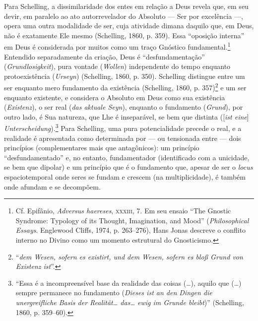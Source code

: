 Para Schelling, a dissimilaridade dos entes em relação a Deus
revela que, em seu devir, em paralelo ao ato autorrevelador do
Absoluto --- Ser por excelência ---, opera uma outra modalidade de
ser, cuja atividade dimana daquilo que, em Deus, não é
exatamente Ele mesmo (Schelling, 1860, p. 359). Essa “oposição
interna” em Deus é considerada por muitos como um traço Gnóstico
fundamental.\footnote{ Cf. Epifânio, \emph{Adversus haereses},
\textsc{xxxiii}, 7. Em seu ensaio “The Gnostic Syndrome: Typology of its
Thought, Imagination, and Mood” (\textit{Philosophical Essays}.
Englewood Cliffs, 1974, p. 263--276), Hans Jonas descreve o
conflito interno no Divino como um momento estrutural do
Gnosticismo.} Entendido separadamente da criação, Deus é
“desfundamentação” (\emph{Grundlosigkeit}), pura vontade
(\emph{Wollen}) independente do tempo enquanto protoexistência
(\emph{Urseyn}) (Schelling, 1860,
p. 350). Schelling distingue entre um ser enquanto mero
fundamento da existência (Schelling, 1860, p. 357)\footnote{
“\emph{dem Wesen, sofern es existirt, und dem Wesen, sofern es
bloß Grund von Existenz ist}”.} e um ser enquanto existente, e
considera o Absoluto em Deus como sua existência
(\emph{Existenz}), o ser real (\emph{das aktuale Seyn}),
enquanto o fundamento (\emph{Grund}), por outro lado, é Sua
natureza, que Lhe é inseparável, se bem que distinta
([\emph{ist eine}] \emph{Unterscheidung}).\footnote{ “Essa é
a incompreensível base da realidade das coisas (\ldots{}), aquilo que
(\ldots{}) sempre permanece no fundamento (\emph{Dieses ist an den
Dingen die unergreifliche Basis der Realität\ldots{} das\ldots{} ewig im
Grunde bleibt})” (Schelling, 1860, p. 359--60).} Para Schelling,
uma pura potencialidade precede o real, e a realidade é
apresentada como determinada por --- ou tensionada entre --- dois
princípios (complementares mais que antagônicos): um princípio
“desfundamentado” e, no entanto, fundamentador (identificado com
a unicidade, se bem que dipolar) e um princípio que é o
fundamento que, apesar de ser o \emph{locus} espaciotemporal
onde seres se fundam e crescem (na multiplicidade), é também
onde afundam e se decompõem. 

